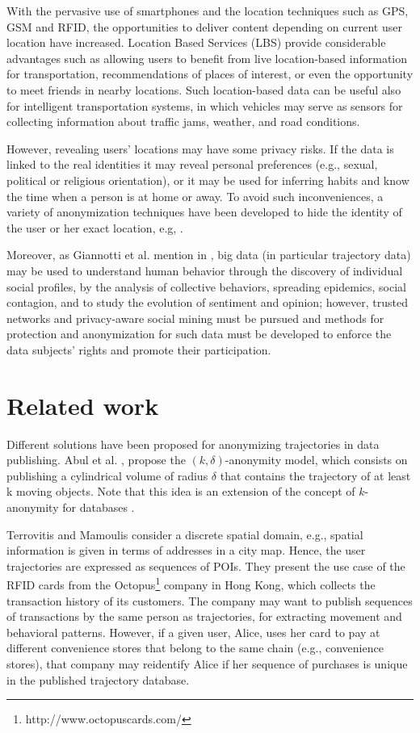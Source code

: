 \documentclass{llncs}
\begin{document}
With the pervasive use of smartphones and the location techniques such as GPS, GSM and RFID, the opportunities to deliver content depending on current user location have increased.
Location Based Services (LBS) provide considerable advantages such as allowing users to benefit from live
location-based information for transportation, recommendations of places of interest, or even the opportunity to meet friends in nearby locations.
Such location-based data can be useful also for intelligent transportation systems, in which vehicles may serve as sensors for collecting information about traffic jams, weather, and road conditions.


However, revealing users' locations may have some privacy risks. If the data is linked to the real identities it may reveal personal preferences (e.g., sexual, political or religious orientation), or it may be used for inferring habits and know the time when a person is at home or away.
To avoid such inconveniences, a variety of anonymization techniques have been developed to hide the identity of the user or her exact location, e.g, \cite{Terrovitis:2011}.


Moreover, as Giannotti et al. mention in \cite{Giannotti2012}, big data (in particular trajectory data) may be used  to understand human behavior through the discovery of individual social profiles, by the analysis of collective behaviors, spreading epidemics, social contagion, and to study the evolution of sentiment and opinion; however, trusted networks and privacy-aware social mining must be pursued and methods for protection and anonymization for such data must be developed to enforce the data subjects' rights and promote their participation.

\section{Related work}
Different solutions have been proposed for anonymizing trajectories in data publishing. Abul et al. \cite{Abul2008}, propose the $(k, \delta)$-anonymity model, which consists on publishing a cylindrical volume of radius $\delta$ that contains the trajectory of at least k moving objects. Note that this idea is an extension of the concept of $k$-anonymity for databases \cite{Samarati:1998}.


Terrovitis and Mamoulis \cite{Terrovitis:2008} consider a discrete spatial domain, e.g., spatial information is given in terms of addresses in a city map.
Hence, the user trajectories are expressed as sequences of POIs.
They present the use case of the RFID cards from the Octopus\footnote{http://www.octopuscards.com/} company in Hong Kong, which collects the transaction history of its customers. The company may want to publish sequences of transactions by the same person as trajectories, for extracting movement and behavioral patterns. However, if a given user, Alice, uses her card to pay at different convenience stores that belong to the same chain (e.g., convenience stores), that company may reidentify Alice if her sequence of purchases is unique in the published trajectory database.
\end{document}
